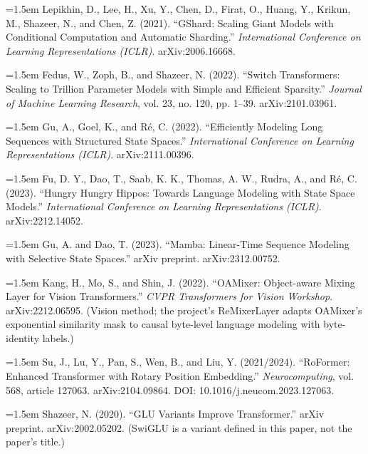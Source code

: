 \documentclass[11pt]{article}
\begin{document}
\par\hangindent=1.5em
Lepikhin, D., Lee, H., Xu, Y., Chen, D., Firat, O., Huang, Y., Krikun, M., Shazeer, N., and Chen, Z. (2021). ``GShard: Scaling Giant Models with Conditional Computation and Automatic Sharding.'' \textit{International Conference on Learning Representations (ICLR)}. arXiv:2006.16668.

\par\hangindent=1.5em
Fedus, W., Zoph, B., and Shazeer, N. (2022). ``Switch Transformers: Scaling to Trillion Parameter Models with Simple and Efficient Sparsity.'' \textit{Journal of Machine Learning Research}, vol. 23, no. 120, pp. 1--39. arXiv:2101.03961.

\par\hangindent=1.5em
Gu, A., Goel, K., and R\'e, C. (2022). ``Efficiently Modeling Long Sequences with Structured State Spaces.'' \textit{International Conference on Learning Representations (ICLR)}. arXiv:2111.00396.

\par\hangindent=1.5em
Fu, D. Y., Dao, T., Saab, K. K., Thomas, A. W., Rudra, A., and R\'e, C. (2023). ``Hungry Hungry Hippos: Towards Language Modeling with State Space Models.'' \textit{International Conference on Learning Representations (ICLR)}. arXiv:2212.14052.

\par\hangindent=1.5em
Gu, A. and Dao, T. (2023). ``Mamba: Linear-Time Sequence Modeling with Selective State Spaces.'' arXiv preprint. arXiv:2312.00752.

\par\hangindent=1.5em
Kang, H., Mo, S., and Shin, J. (2022). ``OAMixer: Object-aware Mixing Layer for Vision Transformers.'' \textit{CVPR Transformers for Vision Workshop}. arXiv:2212.06595. (Vision method; the project's ReMixerLayer adapts OAMixer's exponential similarity mask to causal byte-level language modeling with byte-identity labels.)

\par\hangindent=1.5em
Su, J., Lu, Y., Pan, S., Wen, B., and Liu, Y. (2021/2024). ``RoFormer: Enhanced Transformer with Rotary Position Embedding.'' \textit{Neurocomputing}, vol. 568, article 127063. arXiv:2104.09864. DOI: 10.1016/j.neucom.2023.127063.

\par\hangindent=1.5em
Shazeer, N. (2020). ``GLU Variants Improve Transformer.'' arXiv preprint. arXiv:2002.05202. (SwiGLU is a variant defined in this paper, not the paper's title.)
\end{document}
